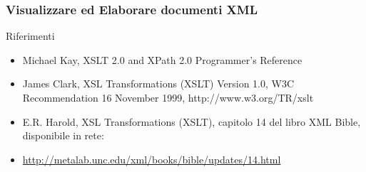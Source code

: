 \begin{frame}
    \frametitle{Visualizzare ed Elaborare documenti XML}
    \addtocounter{nframe}{1}
    

     \begin{block}{Riferimenti}
            \begin{itemize}
                \item Michael Kay, XSLT 2.0 and XPath 2.0 Programmer's Reference
                \item James Clark, XSL Transformations (XSLT) Version 1.0, W3C Recommendation 16 November 1999, http://www.w3.org/TR/xslt
                \item E.R. Harold, XSL Transformations (XSLT), capitolo 14 del libro XML
                Bible, disponibile in rete:
                \item[] \url{http://metalab.unc.edu/xml/books/bible/updates/14.html} 
            \end{itemize}
     \end{block}
    
\end{frame}


